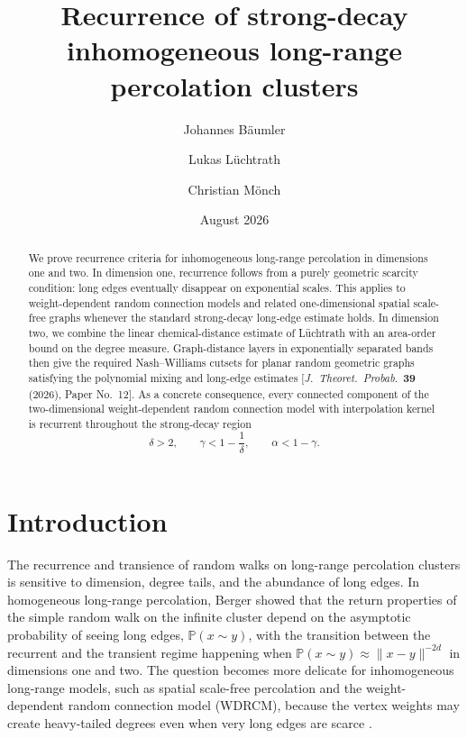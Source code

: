 \documentclass[11pt,a4paper]{scrartcl}
\title{Recurrence of strong-decay inhomogeneous long-range percolation clusters}
\author{Johannes B\"aumler \orcidlink{0000-0002-3823-9899} \and Lukas L\"uchtrath \orcidlink{0000-0003-4969-806X} \and Christian M\"onch \orcidlink{0000-0002-6531-6482}}
\date{August 2026}
\newcommand{\1}{\mathbb{1}}
\begin{document}
\maketitle

\begin{abstract}
\noindent We prove recurrence criteria for inhomogeneous long-range percolation in
dimensions one and two.  In dimension one, recurrence follows from a purely
geometric scarcity condition: long edges eventually disappear on exponential
scales.  This applies to weight-dependent random connection models and related
one-dimensional spatial scale-free graphs whenever the standard strong-decay
long-edge estimate holds.  In dimension two, we combine the linear
chemical-distance estimate of L\"uchtrath with an area-order bound on the
degree measure.  Graph-distance layers in exponentially separated bands then
give the required Nash--Williams cutsets for planar random geometric graphs
satisfying the polynomial mixing and long-edge estimates
[\emph{J.\ Theoret.\ Probab.}~\textbf{39} (2026), Paper No.~12].  As a concrete consequence, every
connected component of the two-dimensional
weight-dependent random connection model with interpolation kernel is
recurrent throughout the strong-decay region
\[
  \delta>2,\qquad
  \gamma<1-\frac1\delta,\qquad
  \alpha<1-\gamma.
\]
\end{abstract}

\section{Introduction}
\label{sec:introduction}

The recurrence and transience of random walks on long-range percolation
clusters is sensitive to dimension, degree tails, and the abundance of long
edges.  In homogeneous long-range percolation, Berger \cite{Berger2002} showed that the return properties of the simple random walk on the infinite cluster depend on the asymptotic probability of seeing long edges, $\mathbb{P}(x\sim y)$, with the transition between the recurrent and the transient regime happening when $\mathbb{P}(x\sim y) \approx \|x-y\|^{-2d}$ in dimensions one and two.  The question becomes more
delicate for inhomogeneous long-range models, such as spatial scale-free
percolation and the weight-dependent random connection model (WDRCM), because the
vertex weights may create heavy-tailed degrees even when very long edges are scarce
\cite{GHMM2022,DeijfenHofstadHooghiemstra2013,KrioukovEtAl2010,
BringmannKeuschLengler2019,GGLM2019,GLM2021,GGM22}.
\end{document}
